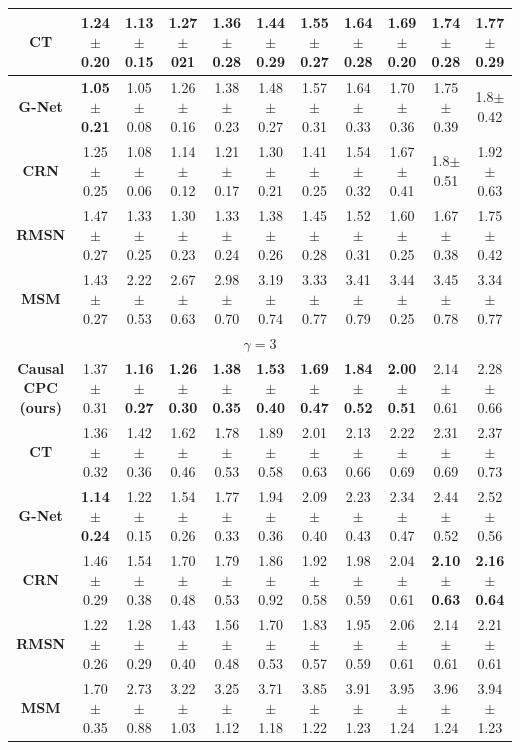 \documentclass{article}
\theoremstyle{plain}
\theoremstyle{definition}
\theoremstyle{remark}
\begin{document}
\begin{table}[!htbp]
{\begin{tabular}{|c|c|c|c|c|c|c|c|c|c|c|}
\textbf{CT} & 1.24$\pm$0.20& 1.13$\pm$0.15& 1.27$\pm$021& 1.36$\pm$0.28& 1.44$\pm$0.29& 1.55$\pm$0.27& 1.64$\pm$0.28& 1.69$\pm$0.20& 1.74$\pm$0.28& 1.77 $\pm$ 0.29\\ 
\hline
 \textbf{G-Net}& \textbf{1.05$\pm$0.21}& 1.05$\pm$0.08& 1.26$\pm$0.16& 1.38$\pm$0.23& 1.48$\pm$0.27& 1.57$\pm$0.31& 1.64$\pm$0.33& 1.70$\pm$0.36& 1.75$\pm$0.39&1.8$\pm$0.42\\\hline
 \textbf{CRN}& 1.25$\pm$0.25& 1.08$\pm$0.06& 1.14$\pm$0.12& 1.21$\pm$0.17& 1.30$\pm$ 0.21& 1.41$\pm$0.25& 1.54$\pm$0.32& 1.67$\pm$0.41& 1.8$\pm$0.51&1.92$\pm$0.63\\\hline
 \textbf{RMSN}& 1.47$\pm$0.27& 1.33$\pm$0.25& 1.30$\pm$0.23& 1.33$\pm$0.24& 1.38$\pm$0.26& 1.45$\pm$0.28& 1.52$\pm$0.31& 1.60$\pm$0.25& 1.67$\pm$0.38&1.75$\pm$0.42\\\hline
 \textbf{MSM}& 1.43$\pm$0.27& 2.22$\pm$0.53& 2.67$\pm$0.63& 2.98$\pm$0.70& 3.19$\pm$0.74& 3.33$\pm$0.77& 3.41$\pm$0.79& 3.44$\pm$0.25& 3.45$\pm$0.78&3.34$\pm$0.77\\\hline
 \multicolumn{11}{|c|}{$ \gamma = 3$} \\
 \hline
  \textbf{Causal CPC (ours)} & 1.37$\pm$0.31& \textbf{1.16$\pm$0.27}& \textbf{1.26$\pm$0.30}& \textbf{1.38$\pm$0.35}& \textbf{1.53$\pm$0.40}& \textbf{1.69$\pm$0.47}&\textbf{ 1.84$\pm$0.52}& \textbf{2.00$\pm$0.51}& 2.14$\pm$0.61& 2.28$\pm$0.66\\ 
   \hline
 \textbf{CT} & 1.36$\pm$0.32& 1.42$\pm$0.36& 1.62$\pm$0.46& 1.78$\pm$0.53& 1.89$\pm$0.58& 2.01$\pm$0.63& 2.13$\pm$0.66& 2.22$\pm$0.69& 2.31$\pm$0.69& 2.37$\pm$0.73\\ 
\hline
\textbf{G-Net} &\textbf{ 1.14$\pm$0.24}& 1.22$\pm$0.15& 1.54$\pm$0.26& 1.77$\pm$0.33& 1.94$\pm$0.36& 2.09$\pm$0.40& 2.23$\pm$0.43& 2.34$\pm$0.47& 2.44$\pm$0.52& 2.52$\pm$0.56\\ 
\hline
 \textbf{CRN}& 1.46$\pm$0.29& 1.54$\pm$0.38& 1.70$\pm$0.48& 1.79$\pm$0.53& 1.86$\pm$0.92& 1.92$\pm$0.58& 1.98$\pm$0.59& 2.04$\pm$0.61& \textbf{2.10$\pm$0.63}&\textbf{2.16$\pm$0.64} \\\hline
 
\textbf{RMSN}& 1.22$\pm$0.26& 1.28$\pm$0.29& 1.43$\pm$0.40& 1.56$\pm$0.48& 1.70$\pm$0.53& 1.83$\pm$0.57& 1.95$\pm$0.59& 2.06$\pm$0.61& 2.14$\pm$0.61&2.21$\pm$0.61\\\hline
  
 \textbf{MSM} & 1.70$\pm$0.35& 2.73$\pm$0.88& 3.22$\pm$1.03& 3.25$\pm$1.12& 3.71$\pm$1.18& 3.85$\pm$1.22& 3.91$\pm$1.23& 3.95$\pm$1.24& 3.96$\pm$1.24&3.94$\pm$1.23\\\hline
 \end{tabular}
 }
\end{table}
\end{document}
